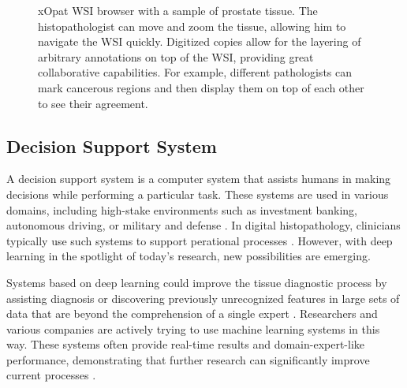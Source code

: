 \begin{figure}[t]
    \centering
    \caption{xOpat \cite{xopat} WSI browser with a sample of prostate tissue. The histopathologist can move and zoom the tissue, allowing him to navigate the WSI quickly. Digitized copies allow for the layering of arbitrary annotations on top of the WSI, providing great collaborative capabilities. For example, different pathologists can mark cancerous regions and then display them on top of each other to see their agreement.}
    \label{fig:xopat}
\end{figure}

\subsection*{Decision Support System}

A decision support system is a computer system that assists humans in making decisions while performing a particular task.
These systems are used in various domains, including high-stake environments such as investment banking, autonomous driving, or military and defense \cite{dss-finance, dss-autonomous-driving, dss-military-and-defense}. In digital histopathology, clinicians typically use such systems to support perational processes \cite{digital-histopathology-process}.
However, with deep learning in the spotlight of today's research, new possibilities are emerging.

Systems based on deep learning could improve the tissue diagnostic process by assisting diagnosis or discovering previously unrecognized features in large sets of data that are beyond the comprehension of a single expert \cite{dss-digital-histopathology}. 
Researchers and various companies are actively trying to use machine learning systems in this way. 
These systems often provide real-time results and domain-expert-like performance, demonstrating that further research can significantly improve current processes \cite{deep-learning-in-histopathology}.

